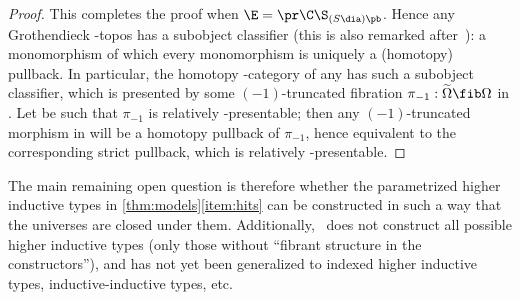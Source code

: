 \begin{proof}
  This completes the proof when $\E=\pr\C\S_{(S\dia)\pb}$.
  Hence any Grothendieck \io-topos has a subobject classifier (this is also remarked after~\cite[Proposition 6.1.6.3]{lurie:higher-topoi}): a monomorphism of which every monomorphism is uniquely a (homotopy) pullback.
  In particular, the homotopy \io-category of any \ttmt \E has such a subobject classifier, which is presented by some $(-1)$-truncated fibration $\pi_{-1}:\widetilde{\Omega} \fib\Omega$ in \E.
  Let \ka be such that $\pi_{-1}$ is relatively \ka-presentable; then any $(-1)$-truncated morphism in \E will be a homotopy pullback of $\pi_{-1}$, hence equivalent to the corresponding strict pullback, which is relatively \ka-presentable.
\end{proof}



The main remaining open question is therefore whether the parametrized higher inductive types in \cref{thm:models}\ref{item:hits} can be constructed in such a way that the universes are closed under them.
Additionally,~\cite{ls:hits} does not construct all possible higher inductive types (only those without ``fibrant structure in the constructors''), and has not yet been generalized to indexed higher inductive types, inductive-inductive types, etc.


